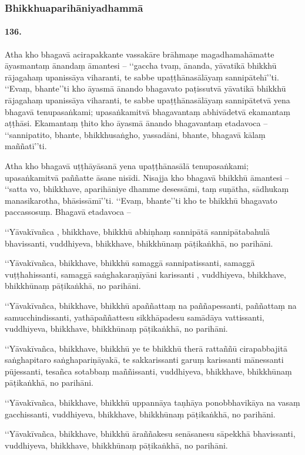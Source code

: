 \subsubsection{Bhikkhuaparihāniyadhammā}

\paragraph{136.} Atha kho bhagavā acirapakkante vassakāre brāhmaṇe magadhamahāmatte āyasmantaṃ ānandaṃ āmantesi – ‘‘gaccha tvaṃ, ānanda, yāvatikā bhikkhū rājagahaṃ upanissāya viharanti, te sabbe upaṭṭhānasālāyaṃ sannipātehī’’ti. ‘‘Evaṃ, bhante’’ti kho āyasmā ānando bhagavato paṭissutvā yāvatikā bhikkhū rājagahaṃ upanissāya viharanti, te sabbe upaṭṭhānasālāyaṃ sannipātetvā yena bhagavā tenupasaṅkami; upasaṅkamitvā bhagavantaṃ abhivādetvā ekamantaṃ aṭṭhāsi. Ekamantaṃ ṭhito kho āyasmā ānando bhagavantaṃ etadavoca – ‘‘sannipatito, bhante, bhikkhusaṅgho, yassadāni, bhante, bhagavā kālaṃ maññatī’’ti.

Atha kho bhagavā uṭṭhāyāsanā yena upaṭṭhānasālā tenupasaṅkami; upasaṅkamitvā paññatte āsane nisīdi. Nisajja kho bhagavā bhikkhū āmantesi – ‘‘satta vo, bhikkhave, aparihāniye dhamme desessāmi, taṃ suṇātha, sādhukaṃ manasikarotha, bhāsissāmī’’ti. ‘‘Evaṃ, bhante’’ti kho te bhikkhū bhagavato paccassosuṃ. Bhagavā etadavoca –

‘‘Yāvakīvañca , bhikkhave, bhikkhū abhiṇhaṃ sannipātā sannipātabahulā bhavissanti, vuddhiyeva, bhikkhave, bhikkhūnaṃ pāṭikaṅkhā, no parihāni.

‘‘Yāvakīvañca, bhikkhave, bhikkhū samaggā sannipatissanti, samaggā vuṭṭhahissanti, samaggā saṅghakaraṇīyāni karissanti , vuddhiyeva, bhikkhave, bhikkhūnaṃ pāṭikaṅkhā, no parihāni.

‘‘Yāvakīvañca, bhikkhave, bhikkhū apaññattaṃ na paññapessanti, paññattaṃ na samucchindissanti, yathāpaññattesu sikkhāpadesu samādāya vattissanti, vuddhiyeva, bhikkhave, bhikkhūnaṃ pāṭikaṅkhā, no parihāni.

‘‘Yāvakīvañca, bhikkhave, bhikkhū ye te bhikkhū therā rattaññū cirapabbajitā saṅghapitaro saṅghapariṇāyakā, te sakkarissanti garuṃ karissanti mānessanti pūjessanti, tesañca sotabbaṃ maññissanti, vuddhiyeva, bhikkhave, bhikkhūnaṃ pāṭikaṅkhā, no parihāni.

‘‘Yāvakīvañca, bhikkhave, bhikkhū uppannāya taṇhāya ponobbhavikāya na vasaṃ gacchissanti, vuddhiyeva, bhikkhave, bhikkhūnaṃ pāṭikaṅkhā, no parihāni.

‘‘Yāvakīvañca, bhikkhave, bhikkhū āraññakesu senāsanesu sāpekkhā bhavissanti, vuddhiyeva, bhikkhave, bhikkhūnaṃ pāṭikaṅkhā, no parihāni.

